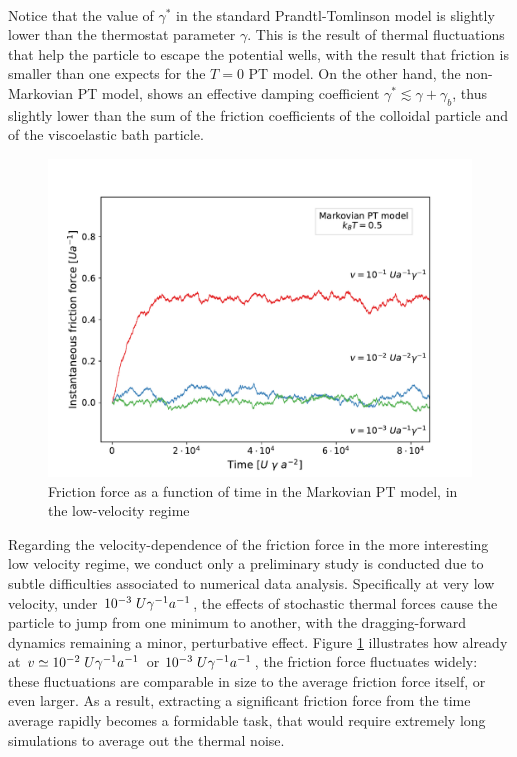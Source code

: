 \\
Notice that the value of $\gamma^*$ in the standard Prandtl-Tomlinson model is slightly lower than the thermostat parameter $\gamma$. This is the result of thermal fluctuations that help the particle to escape the potential wells, with the result that friction is smaller than one expects for the $T=0$ PT model. On the other hand, the non-Markovian PT model, shows an effective damping coefficient $\gamma^* \lesssim \gamma + \gamma_b$, thus slightly lower than the sum of the friction coefficients of the colloidal particle and of the viscoelastic bath particle.
\begin{figure}
    \centering
    \includegraphics[width=\textwidth]{basseV_kb0_forzaplot.pdf}
    \caption{Friction force as a function of time in the Markovian PT model, in the low-velocity regime }
    \label{fig:basseV_kb0_friction}
\end{figure}
Regarding the velocity-dependence of the friction force in the more interesting low velocity regime, we conduct only a preliminary study is conducted due to subtle difficulties associated to numerical data analysis. Specifically at very low velocity, under $10^{-3}\hspace{0.1cm}U\gamma^{-1} a^{-1}$, the effects of stochastic thermal forces cause the particle to jump from one minimum to another, with the dragging-forward dynamics remaining a minor, perturbative effect. Figure \ref{fig:basseV_kb0_friction} illustrates how already at $v \simeq 10^{-2}\hspace{0.1cm}U\gamma^{-1} a^{-1}$ or $10^{-3}\hspace{0.1cm}U\gamma^{-1} a^{-1}$, the friction force fluctuates widely: these fluctuations are comparable in size to the average friction force itself, or even larger. As a result, extracting a significant friction force from the time average rapidly becomes a formidable task, that would require extremely long simulations to average out the thermal noise.

